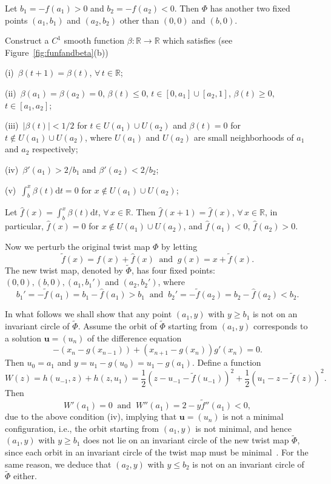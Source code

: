 \documentclass[12pt]{article}
\newcommand{\R}{\mathbb{R}}
\newcommand{\eps}{\varepsilon}
\newcommand{\ubf}{{\mathbf{u}}}
\begin{document}
Let $b_1=-f(a_1)>0$ and $b_2=-f(a_2)<0$. Then $\Phi$ has another two fixed points $(a_1,b_1)$ and $(a_2,b_2)$ other than $(0,0)$ and $(b,0)$. 

Construct a $C^1$ smooth function $\beta:\R\to\R$ which satisfies (see  Figure~\ref{fig:funfandbeta}(b))

(i)\ $\beta(t+1)=\beta(t)$, $\forall\,t\in\R$;

(ii)\ $\beta(a_1)=\beta(a_2)=0$, $\beta(t)\le 0$, $t\in [0,a_1]\cup [a_2,1]$, $\beta(t)\ge 0$, $t\in [a_1,a_2]$;

(iii)\ $|\beta(t)|<1/2 $ for $t\in U(a_1)\cup U(a_2)$ and $\beta(t)= 0$ for $t\not\in U(a_1)\cup U(a_2)$, where $U(a_1)$  and $U(a_2)$ are small neighborhoods of $a_1$ and $a_2$ respectively;

(iv)\ $\beta'(a_1)>2/b_1$ and $\beta'(a_2)<2/b_2$;

(v)\ $\int_b^x\beta(t)\mbox{d}t=0$ for $x\not\in U(a_1)\cup U(a_2)$;


Let $\hat{f}(x)=\int_b^x\beta(t)\mbox{d}t$, $\forall\,x\in\R$. Then $
\hat{f}(x+1)=\hat{f}(x)$, $\forall\,x\in\R$, in particular, $\hat{f}(x)=0$ for $x\not\in U(a_1)\cup U(a_2)$,
and $\hat{f}(a_1)<0$, $\hat{f}(a_2)>0$.

Now we perturb the original twist map $\Phi$ by letting 
$$
\tilde{f}(x)=f(x)+\hat{f}(x)\ \mbox{ and }\ g(x)=x+\tilde{f}(x).
$$
The new twist map, denoted by $\tilde{\Phi}$, has four fixed points: $(0,0), (b,0), (a_1,b_1')$ and $(a_2,b_2')$, where
$$
b_1'=-\tilde{f}(a_1)=b_1-\hat{f}(a_1)>b_1\ \mbox{ and }\ b_2'=-\tilde{f}(a_2)=b_2-\hat{f}(a_2)<b_2.
$$

In what follows we shall show that any point $(a_1,y)$ with $y\ge b_1$ is not on an invariant circle of $\tilde{\Phi}$. Assume the orbit of $\tilde{\Phi}$ starting from $(a_1,y)$ corresponds to a solution $\ubf=(u_n)$ of the difference equation
$$
-(x_n-g(x_{n-1}))+(x_{n+1}-g(x_n))g'(x_n)=0.
$$
Then $u_0=a_1$ and $y=u_1-g(u_0)=u_1-g(a_1)$.
Define a function
$$
W(z)=h(u_{-1},z)+h(z,u_1)=\frac{1}{2}(z-u_{-1}-\tilde{f}(u_{-1}))^2+\frac{1}{2}(u_1-z-\tilde{f}(z))^2.
$$
Then 
$$
W'(a_1)=0\ \mbox{ and }\ W''(a_1)=2-y\tilde{f}''(a_1)<0,
$$
due to the above condition (iv), implying that $\ubf=(u_n)$ is not a minimal configuration, i.e., the orbit starting from $(a_1,y)$ is not  minimal, and hence $(a_1, y)$ with $y\ge b_1$  does not lie on an invariant circle of the new twist map $\tilde{\Phi}$, since each orbit in an invariant circle of the twist map must be minimal~\cite{Ban,Mat0}. For the same reason, we deduce that $(a_2,y)$ with $y\le b_2$ is not on an invariant circle of $\tilde{\Phi}$ either.
\end{document}
